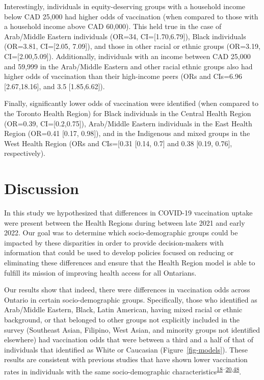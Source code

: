 \documentclass[
  letterpaper,
  DIV=11,
  numbers=noendperiod]{scrartcl}
\begin{document}
Interestingly, individuals in equity-deserving groups with a household
income below CAD 25,000 had higher odds of vaccination (when compared to
those with a household income above CAD 60,000). This held true in the
case of Arab/Middle Eastern individuals (OR=34, CI={[}1.70,6.79{]}),
Black individuals (OR=3.81, CI={[}2.05, 7.09{]}), and those in other
racial or ethnic groups (OR=3.19, CI={[}2.00,5.09{]}). Additionally,
individuals with an income between CAD 25,000 and 59,999 in the
Arab/Middle Eastern and other racial ethnic groups also had higher odds
of vaccination than their high-income peers (ORs and CIs=6.96
{[}2.67,18.16{]}, and 3.5 {[}1.85,6.62{]}).

Finally, significantly lower odds of vaccination were identified (when
compared to the Toronto Health Region) for Black individuals in the
Central Health Region (OR=0.39, CI={[}0.2,0.75{]}), Arab/Middle Eastern
individuals in the East Health Region (OR=0.41 {[}0.17, 0.98{]}), and in
the Indigenous and mixed groups in the West Health Region (ORs and
CIs={[}0.31 {[}0.14, 0.7{]} and 0.38 {[}0.19, 0.76{]}, respectively).

\hypertarget{discussion}{%
\section{Discussion}\label{discussion}}

In this study we hypothesized that differences in COVID-19 vaccination
uptake were present between the Health Regions during between late 2021
and early 2022. Our goal was to determine which socio-demographic groups
could be impacted by these disparities in order to provide
decision-makers with information that could be used to develop policies
focused on reducing or eliminating these differences and ensure that the
Health Region model is able to fulfill its mission of improving health
access for all Ontarians.

Our results show that indeed, there were differences in vaccination odds
across Ontario in certain socio-demographic groups. Specifically, those
who identified as Arab/Middle Eastern, Black, Latin American, having
mixed racial or ethnic background, or that belonged to other groups not
explicitly included in the survey (Southeast Asian, Filipino, West
Asian, and minority groups not identified elsewhere) had vaccination
odds that were between a third and a half of that of individuals that
identified as White or Caucasian (Figure~\ref{fig-models}). These
results are consistent with previous studies that have shown lower
vaccination rates in individuals with the same socio-demographic
characteristics\textsuperscript{\protect\hyperlink{ref-guay2022}{18}--\protect\hyperlink{ref-hussain2022}{20},\protect\hyperlink{ref-carter2022}{48}}.
\end{document}
